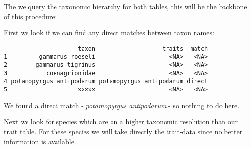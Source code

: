 The we query the taxonomic hierarchy for both tables, this will be the backbone of this procedure:
\begin{knitrout}
\color{fgcolor}\small\begin{kframe}
\begin{alltt}
 \hlkwb{<-} \hlstd{(}\hlopt{$}
 \hlkwb{<-} \hlstd{(}\hlopt{$}
\end{alltt}
\end{kframe}
\end{knitrout}


First we look if we can find any direct matches between taxon names:
\begin{knitrout}
\color{fgcolor}\small\begin{kframe}
\begin{alltt}
 \hlkwb{<-} \hlopt{$}\hlopt{$}
\hlopt{$} \hlkwb{<-} \hlopt{$}
\hlopt{$} \hlkwb{<-} \hlstd{(}\hlopt{!} \hlstd{,} \hlstd{)}
\end{alltt}
\begin{verbatim}
                     taxon                   traits  match
1         gammarus roeseli                     <NA>   <NA>
2        gammarus tigrinus                     <NA>   <NA>
3           coenagrionidae                     <NA>   <NA>
4 potamopyrgus antipodarum potamopyrgus antipodarum direct
5                    xxxxx                     <NA>   <NA>
\end{verbatim}
\end{kframe}
\end{knitrout}


We found a direct match - \emph{potamopyrgus antipodarum} - so nothing to do here.


Next we look for species which are on a higher taxonomic resolution than our trait table. 
For these species we will take directly the trait-data since no better information is available.

